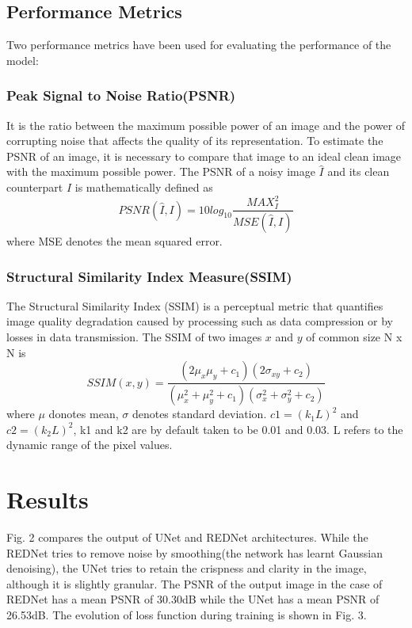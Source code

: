 \documentclass[journal]{IEEEtran} %
\begin{document}
\subsection{Performance Metrics}
Two performance metrics have been used for evaluating the performance of the model:
\subsubsection{Peak Signal to Noise Ratio(PSNR)}
It is the ratio between the maximum possible power of an image and the power of corrupting noise that affects the quality of its representation. To estimate the PSNR of an image, it is necessary to compare that image to an ideal clean image with the maximum possible power. The PSNR of a noisy image $\hat{I}$ and its clean counterpart $I$ is mathematically defined as 
\begin{equation}
    PSNR(\hat{I}, I) = 10 log_{10}\frac{MAX_{I}^2}{MSE(\hat{I}, I)}
\end{equation}
where MSE denotes the mean squared error.

\subsubsection{Structural Similarity Index Measure(SSIM)}
The Structural Similarity Index (SSIM) is a perceptual metric that quantifies image quality degradation caused by processing such as data compression or by losses in data transmission. The SSIM of two images $x$ and $y$ of common size N x N is 
\begin{equation}
    SSIM(x, y) = \frac{(2\mu_{x}\mu_{y} + c_1)(2\sigma_{xy} + c_2)}{(\mu_{x}^2 + \mu_{y}^2 + c_1)(\sigma_{x}^2 + \sigma_{y}^2 + c_2)}
\end{equation}
where $\mu$ donotes mean, $\sigma$ denotes standard deviation. $c1 = (k_1 L)^2$ and $c2 = (k_2 L)^2$, k1 and k2 are by default taken to be 0.01 and 0.03. L refers to the dynamic range of the pixel values.

\section{Results}
Fig. 2 compares the output of UNet and REDNet architectures. While the REDNet tries to remove noise by smoothing(the network has learnt Gaussian denoising), the UNet tries to retain the crispness and clarity in the image, although it is slightly granular. The PSNR of the output image in the case of REDNet has a mean PSNR of 30.30dB while the UNet has a mean PSNR of 26.53dB. The evolution of loss function during training is shown in Fig. 3.
\end{document}
